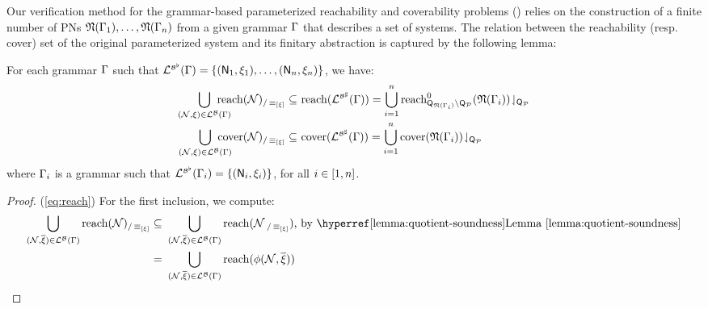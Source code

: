 Our verification method for the grammar-based parameterized
reachability and coverability problems
() relies on the construction
of a finite number of PNs $\mathfrak{N}({\Gamma_1}), \ldots,
\mathfrak{N}({\Gamma_n})$ from a given grammar $\Gamma$ that describes a
set of systems. \ifLongVersion The relation between the reachability (resp. cover)
set of the original parameterized system and its finitary abstraction
is captured by the following lemma: \fi

\ifLongVersion\else
\begin{textAtEnd}[category=proofs]
\fi
\begin{lemma}\label{lemma:soundness}
  For each grammar $\Gamma$ such that
  $\mathcal{L}_{}^{\scriptscriptstyle{{\mathcal{B}}^\flat}}({\Gamma}) =
  {\{ {(\mathsf{N}_1,\xi_1), \ldots, (\mathsf{N}_n, \xi_n)} \}}$, we have:
  \begin{align}
    \label{eq:reach}
    \bigcup_{(\amarkednet,\sources)\in\alangof{}{\algof{B}}{\grammar}} \hspace*{-5mm} \reach{\amarkednet}_{/\foldrel{\sources}} \subseteq &
    ~\reach{\alangof{}{\absof{\algof{B}}}{\grammar}} = \bigcup_{i=1}^n \proj{\zreach{\placeof{\foldpn{\grammar_i}} \setminus \placeof{\ptypes}}{\foldpn{\grammar_i}}}{\placeof{\ptypes}} \\[-1mm]
    \label{eq:cover}
    \bigcup_{(\amarkednet,\sources)\in\alangof{}{\algof{B}}{\grammar}} \hspace*{-5mm} \cover{\amarkednet}_{/\foldrel{\sources}} \subseteq &
    ~\cover{\alangof{}{\absof{\algof{B}}}{\grammar}} = \bigcup_{i=1}^n \proj{\cover{\foldpn{\grammar_i}}}{\placeof{\ptypes}}
  \end{align}
  where $\Gamma_i$ is a grammar such that
  $\mathcal{L}_{}^{\scriptscriptstyle{{\mathcal{B}}^\flat}}({\Gamma_i}) =
  {\{ {(\mathsf{N}_i,\xi_i)} \}}$, for all $i \in {[{1},{n}]}$.
\end{lemma}
\begin{proof}
  (\ref{eq:reach}) For the first inclusion, we compute:
  \begin{align*}
    \bigcup_{(\amarkednet,\overline{\sources})\in\alangof{}{\algof{B}}{\grammar}}\reach{\amarkednet}_{/\foldrel{\sources}} \subseteq
    & ~\bigcup_{(\amarkednet,\overline{\sources})\in\alangof{}{\algof{B}}{\grammar}}\reach{\amarkednet_{~/\foldrel{\sources}}} \text{, by \lemref{lemma:quotient-soundness}} \\
    = & ~\bigcup_{(\amarkednet,\overline{\sources})\in\alangof{}{\algof{B}}{\grammar}}\reach{\foldof{\amarkednet,\overline{\sources}}} \\

\end{align*}
\end{proof}
\end{textAtEnd}
